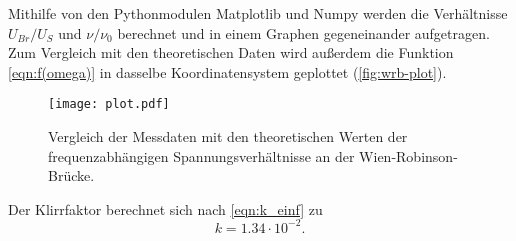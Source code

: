 \noindent Mithilfe von den Pythonmodulen Matplotlib \cite{matplotlib} und Numpy \cite{numpy} werden die Verhältnisse $U_{Br}/U_S$ und $\nu/\nu_0$ berechnet und in einem Graphen gegeneinander aufgetragen.
Zum Vergleich mit den theoretischen Daten wird außerdem die Funktion \ref{eqn:f(omega)} in dasselbe Koordinatensystem geplottet (\autoref{fig:wrb-plot}).
\begin{figure}[H]
  \centering
  \texttt{[image: plot.pdf]}
  \caption{Vergleich der Messdaten mit den theoretischen Werten der frequenzabhängigen Spannungsverhältnisse an der Wien-Robinson-Brücke.}
  \label{fig:wrb-plot}
\end{figure}
Der Klirrfaktor berechnet sich nach \autoref{eqn:k_einf} zu
\begin{equation*}
  k=1.34 \cdot 10^{-2}.
\end{equation*}






